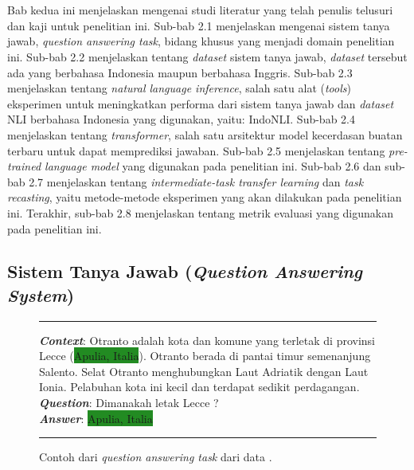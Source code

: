\chapter{\babDua}
\label{bab:2}
Bab kedua ini menjelaskan mengenai studi literatur yang telah penulis telusuri dan kaji untuk penelitian ini. Sub-bab 2.1 menjelaskan mengenai sistem tanya jawab, \emph{question answering task}, bidang khusus yang menjadi domain penelitian ini. Sub-bab 2.2 menjelaskan tentang \emph{dataset} sistem tanya jawab, \emph{dataset} tersebut ada yang berbahasa Indonesia maupun berbahasa Inggris. Sub-bab 2.3 menjelaskan tentang \emph{natural language inference}, salah satu alat (\emph{tools}) eksperimen untuk meningkatkan performa dari sistem tanya jawab dan \emph{dataset} NLI berbahasa Indonesia yang digunakan, yaitu: IndoNLI. Sub-bab 2.4 menjelaskan tentang \emph{transformer}, salah satu arsitektur model kecerdasan buatan terbaru untuk dapat memprediksi jawaban. Sub-bab 2.5 menjelaskan tentang \emph{pre-trained language model} yang digunakan pada penelitian ini. Sub-bab 2.6 dan sub-bab 2.7 menjelaskan tentang \emph{intermediate-task transfer learning} dan \emph{task recasting}, yaitu metode-metode eksperimen yang akan dilakukan pada penelitian ini. Terakhir, sub-bab 2.8 menjelaskan tentang metrik evaluasi yang digunakan pada penelitian ini.

\section{Sistem Tanya Jawab (\emph{Question Answering System})}

\begin{figure}[h]
\vspace{3pt}
\hrule
\vspace{3pt}

\textbf{\emph{Context}}: Otranto adalah kota dan komune yang terletak di  \colorbox{BurntOrange}{provinsi Lecce} (\colorbox{ForestGreen}{Apulia, Italia}). Otranto berada di pantai timur semenanjung Salento. Selat Otranto menghubungkan Laut Adriatik dengan Laut Ionia. Pelabuhan kota ini kecil dan terdapat sedikit perdagangan.\\

\textbf{\emph{Question}}: \colorbox{BurntOrange}{Dimanakah letak Lecce ?}\\

\textbf{\emph{Answer}}:  \colorbox{ForestGreen}{Apulia, Italia}

\vspace{3pt}
\hrule
\vspace{3pt}
\centering
\caption{Contoh dari \emph{question answering task} dari data \citep{putri-oh-2022-idk}.}
\end{figure}

